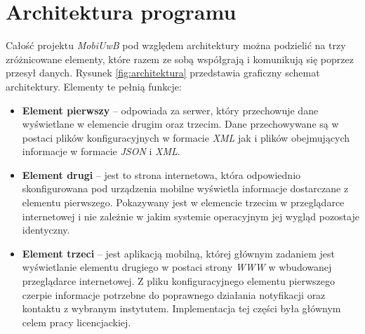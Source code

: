 \documentclass{iiuwb}
\begin{document}
\section{Architektura programu}
Całość projektu \textit{MobiUwB} pod względem architektury można podzielić na trzy zróżnicowane elementy, które razem ze sobą współgrają i komunikują się poprzez przesył danych. Rysunek \ref{fig:architektura} przedstawia graficzny schemat architektury. Elementy te pełnią funkcje:
\begin{itemize}
\item \textbf{Element pierwszy} -- odpowiada za serwer, który przechowuje dane wyświetlane w elemencie drugim oraz trzecim. Dane przechowywane są w postaci plików konfiguracyjnych w formacie \textit{XML} jak i plików obejmujących informacje w formacie \textit{JSON} i \textit{XML}.
\item \textbf{Element drugi} -- jest to strona internetowa, która odpowiednio skonfigurowana pod urządzenia mobilne wyświetla informacje dostarczane z elementu pierwszego. Pokazywany jest w elemencie trzecim w przeglądarce internetowej i nie zależnie w jakim systemie operacyjnym jej wygląd pozostaje identyczny. 
\item \textbf{Element trzeci} -- jest aplikacją mobilną, której głównym zadaniem jest wyświetlanie elementu drugiego w postaci strony \textit{WWW} w wbudowanej przeglądarce internetowej. Z pliku konfiguracyjnego elementu pierwszego czerpie informacje potrzebne do poprawnego działania notyfikacji oraz kontaktu z wybranym instytutem. Implementacja tej części była głównym celem pracy licencjackiej.
\end{itemize}
\end{document}
